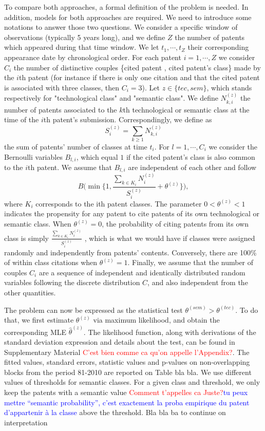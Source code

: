 \documentclass[10pt,A4]{article}
\begin{document}
To compare both approaches, a formal definition of the problem is needed. In addition, models for both approaches are required. We need to introduce some notations to answer those two questions. We consider a specific window of observations (typically 5 years long), and we define $Z$ the number of patents which appeared during that time window. We let $t_1, \cdots, t_Z$ their corresponding appearance date by chronological order. For each patent $i=1, \cdots, Z$ we consider $C_i$ the number of distinctive couples \{cited patent , cited patent's class\} made by the $i$th patent (for instance if there is only one citation and that the cited patent is associated with three classes, then $C_i = 3$). Let $z \in \{tec, sem\}$, which stands respectively for "technological class" and "semantic class". We define $N_{k,i}^{(z)}$  the number of patents associated to the $k$th technological or semantic class at the time of the $i$th patent's submission. Correspondingly, we define as
$$S_i^{(z)} = \sum_{k \geq 1} N_{k,i}^{(z)}$$
the sum of patents' number of classes at time $t_i$. For $l = 1, \cdots, C_i$ we consider the Bernoulli variables $B_{l,i}$, which equal $1$ if the cited patent's class is also common to the $i$th patent. We assume that $B_{l,i}$ are independent of each other and follow 
$$B \Big( \min \Big\{ 1, \frac{\sum_{k \in K_{i}} N_i^{(z)}}{S_i^{(z)}} + \theta^{(z)} \Big\} \Big),$$ 
where $K_i$ corresponds to the ith patent classes. The parameter $0 < \theta^{(z)} < 1$ indicates the propensity for any patent to cite patents of its own technological or semantic class. When $\theta^{(z)} = 0$, the probability of citing patents from its own class is simply $\frac{\sum_{k \in K_{i}} N_i^{(z)}}{S_i^{(z)}}$ , which is what we would have if classes were assigned randomly and independently from patents' contents. Conversely, there are 100\% of within class citations when $\theta^{(z)} = 1$. Finally, we assume that the number of couples $C_i$ are a sequence of independent and identically distributed random variables following the discrete distribution $C$, and also independent from the other quantities.

The problem can now be expressed as the statistical test $\theta^{(sem)} > \theta^{(tec)}$. To do that, we first estimate $\theta^{(z)}$ via maximum likelihood, and obtain the corresponding MLE $\hat{\theta}^{(z)}$. The likelihood function, along with derivations of the standard deviation expression and details about the test, can be found in Supplementary Material \textcolor{red}{C'est bien comme ca qu'on appelle l'Appendix?}. The fitted values, standard errors, statistic values and p-values on non-overlapping blocks from the period 81-2010 are reported on Table bla bla. We use different values of thresholds for semantic classes. For a given class and threshold, we only keep the patents with a semantic value \textcolor{red}{Comment t'appelles ca Juste?}\textcolor{blue}{tu peux mettre ``semantic probability'', c'est exactement la proba empirique du patent d'appartenir à la classe} above the threshold. Bla bla ba to continue on interpretation
\end{document}
